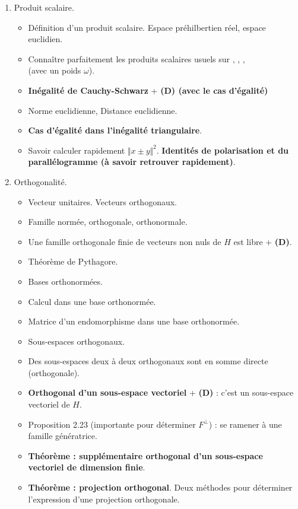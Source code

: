 \documentclass[twoside,a4paper,french,10pt]{VcCours}
\begin{document}
  \begin{enumerate}
  \item Produit scalaire.
  \begin{itemize}
  \item Définition d'un produit scalaire. Espace préhilbertien réel, espace euclidien.
  \item Connaître parfaitement les produits scalaires usuels sur , , , \\ (avec un poids $\omega$).
  \item \textbf{Inégalité de Cauchy-Schwarz} + \textbf{(D) (avec le cas d'égalité)}
  \item Norme euclidienne, Distance euclidienne.
  \item \textbf{Cas d'égalité dans l'inégalité triangulaire}.
  \item Savoir calculer rapidement $\Vert x \pm y \Vert^2$. \textbf{Identités de polarisation et du parallélogramme (à savoir retrouver rapidement)}.
  \end{itemize}
  \item Orthogonalité.
  \begin{itemize}
  \item Vecteur unitaires. Vecteurs orthogonaux. 
  \item Famille normée, orthogonale, orthonormale.
  \item Une famille orthogonale finie de vecteurs non nuls de $H$ est libre + \textbf{(D)}.
  \item Théorème de Pythagore.
  \item Bases orthonormées.
  \item Calcul dans une base orthonormée.
  \item Matrice d'un endomorphisme dans une base orthonormée.
  \item Sous-espaces orthogonaux.
  \item Des sous-espaces deux à deux orthogonaux sont en somme directe (orthogonale).
  \item \textbf{Orthogonal d'un sous-espace vectoriel} + \textbf{(D)} : c'est un sous-espace vectoriel de $H$.
  \item Proposition 2.23 (importante pour déterminer $F^{\perp}$) : se ramener à une famille génératrice.
  \item \textbf{Théorème : supplémentaire orthogonal d'un sous-espace vectoriel de dimension finie}. 
  \item \textbf{Théorème : projection orthogonal}. Deux méthodes pour déterminer l'expression d'une projection orthogonale.

\end{itemize}
\end{enumerate}
\end{document}
